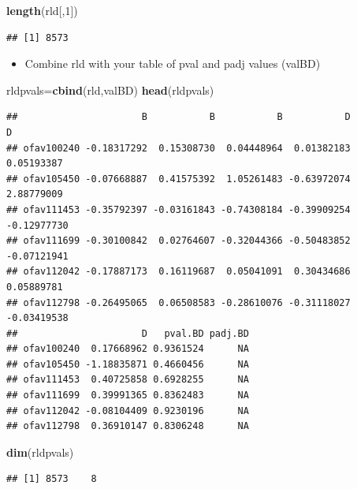 \documentclass[
]{article}
\newenvironment{Shaded}{\begin{snugshade}}{\end{snugshade}}
\newcommand{\DecValTok}[1]{\textcolor[rgb]{0.00,0.00,0.81}{#1}}
\newcommand{\KeywordTok}[1]{\textcolor[rgb]{0.13,0.29,0.53}{\textbf{#1}}}
\newcommand{\NormalTok}[1]{#1}
\providecommand{\tightlist}{%
  \setlength{\itemsep}{0pt}\setlength{\parskip}{0pt}}
\begin{document}
\begin{Shaded}
\begin{Highlighting}[]
\KeywordTok{length}\NormalTok{(rld[,}\DecValTok{1}\NormalTok{])}
\end{Highlighting}
\end{Shaded}

\begin{verbatim}
## [1] 8573
\end{verbatim}

\begin{itemize}
\tightlist
\item
  Combine rld with your table of pval and padj values (valBD)
\end{itemize}

\begin{Shaded}
\begin{Highlighting}[]
\NormalTok{rldpvals=}\KeywordTok{cbind}\NormalTok{(rld,valBD)}
\KeywordTok{head}\NormalTok{(rldpvals)}
\end{Highlighting}
\end{Shaded}

\begin{verbatim}
##                      B           B           B           D           D
## ofav100240 -0.18317292  0.15308730  0.04448964  0.01382183  0.05193387
## ofav105450 -0.07668887  0.41575392  1.05261483 -0.63972074  2.88779009
## ofav111453 -0.35792397 -0.03161843 -0.74308184 -0.39909254 -0.12977730
## ofav111699 -0.30100842  0.02764607 -0.32044366 -0.50483852 -0.07121941
## ofav112042 -0.17887173  0.16119687  0.05041091  0.30434686  0.05889781
## ofav112798 -0.26495065  0.06508583 -0.28610076 -0.31118027 -0.03419538
##                      D   pval.BD padj.BD
## ofav100240  0.17668962 0.9361524      NA
## ofav105450 -1.18835871 0.4660456      NA
## ofav111453  0.40725858 0.6928255      NA
## ofav111699  0.39991365 0.8362483      NA
## ofav112042 -0.08104409 0.9230196      NA
## ofav112798  0.36910147 0.8306248      NA
\end{verbatim}

\begin{Shaded}
\begin{Highlighting}[]
\KeywordTok{dim}\NormalTok{(rldpvals)}
\end{Highlighting}
\end{Shaded}

\begin{verbatim}
## [1] 8573    8
\end{verbatim}
\end{document}
